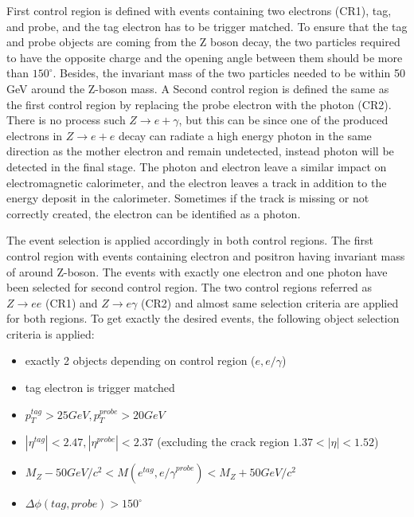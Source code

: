 First control region is defined with events containing two electrons (CR1), tag, and probe, and the tag electron has to be trigger matched. To ensure that the tag and probe objects are coming from the Z boson decay, the two particles required to have the opposite charge and the opening angle between them should be more than $150^\circ$. Besides, the invariant mass of the two particles needed to be within 50 GeV around the Z-boson mass.
A Second control region is defined the same as the first control region by replacing the probe electron with the photon (CR2). There is no process such $Z\rightarrow e+\gamma$, but this can be since one of the produced electrons in $Z\rightarrow e+e$ decay can radiate a high energy photon in the same direction as the mother electron and remain undetected, instead photon will be detected in the final stage. The photon and electron leave a similar impact on electromagnetic calorimeter, and the electron leaves a track in addition to the energy deposit in the calorimeter. Sometimes if the track is missing or not correctly created, the electron can be identified as a photon.

The event selection is applied accordingly in both control regions. The first control region with events containing electron and positron having invariant mass of around Z-boson. The events with exactly one electron and one photon have been selected for second control region. The two control regions referred as $Z \rightarrow ee$ (CR1) and $Z \rightarrow e\gamma$ (CR2) and almost same selection criteria are applied for both regions. To get exactly the desired events, the following object selection criteria is applied:
\begin{itemize}
\item exactly 2 objects depending on control region ($e, e/\gamma$)
\item tag electron is trigger matched
\item $p_{T}^{tag} > 25GeV, p_{T}^{probe} > 20 GeV$
\item $|\eta^{tag}| < 2.47, |\eta^{probe}| < 2.37$ (excluding the crack region $1.37 < |\eta| < 1.52$)
\item $M_{Z}-50 GeV/c^{2} < M(e^{tag},{e/\gamma}^{probe}) < M_{Z}+50 GeV/c^{2}$
\item $\Delta\phi (tag,probe) > 150^\circ$
\end{itemize}


